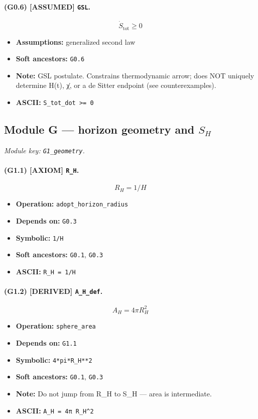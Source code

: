 \documentclass[11pt,a4paper]{article}
\theoremstyle{remark}\newtheorem*{caution}{Caution}
\newcommand{\tagbox}[1]{\textsc{[#1]}}
\begin{document}
\paragraph{(G0.6) \tagbox{ASSUMED} \texttt{GSL}.}
\begin{equation}
\dot S_{\mathrm{tot}}\ge 0
\tag{G0.6}
\end{equation}
\begin{itemize}\setlength{\itemsep}{0.12em}
\item \textbf{Assumptions:} generalized second law
\item \textbf{Soft ancestors:} \texttt{G0.6}
\item \textbf{Note:} GSL postulate. Constrains thermodynamic arrow; does NOT uniquely determine H(t), χ̇, or a de Sitter endpoint (see counterexamples).
\item \textbf{ASCII:} \texttt{S\_tot\_dot >= 0}
\end{itemize}
\subsection{Module G --- horizon geometry and $S_H$}
\textit{Module key: \texttt{G1\_geometry}.}
\paragraph{(G1.1) \tagbox{AXIOM} \texttt{R\_H}.}
\begin{equation}
R_H=1/H
\tag{G1.1}
\end{equation}
\begin{itemize}\setlength{\itemsep}{0.12em}
\item \textbf{Operation:} \texttt{adopt\_horizon\_radius}
\item \textbf{Depends on:} \texttt{G0.3}
\item \textbf{Symbolic:} \texttt{1/H}
\item \textbf{Soft ancestors:} \texttt{G0.1}, \texttt{G0.3}
\item \textbf{ASCII:} \texttt{R\_H = 1/H}
\end{itemize}
\paragraph{(G1.2) \tagbox{DERIVED} \texttt{A\_H\_def}.}
\begin{equation}
A_H=4\pi R_H^2
\tag{G1.2}
\end{equation}
\begin{itemize}\setlength{\itemsep}{0.12em}
\item \textbf{Operation:} \texttt{sphere\_area}
\item \textbf{Depends on:} \texttt{G1.1}
\item \textbf{Symbolic:} \texttt{4*pi*R\_H**2}
\item \textbf{Soft ancestors:} \texttt{G0.1}, \texttt{G0.3}
\item \textbf{Note:} Do not jump from R\_H to S\_H — area is intermediate.
\item \textbf{ASCII:} \texttt{A\_H = 4π R\_H^2}
\end{itemize}
\end{document}
